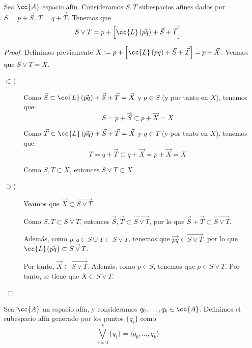 \begin{prop}
    Sea $\cc{A}$ espacio afín. Consideramos $S,T$ subespacios afines dados por $S=p+\vec{S}$, $T=q+\vec{T}$. Tenemos que
    $$S\vee T = p+\left[\cc{L}\left(\vec{pq}\right) + \vec{S} + \vec{T}\right]$$
\end{prop}
\begin{proof}Definimos previamente $X:=p+\left[\cc{L}\left(\vec{pq}\right) + \vec{S} + \vec{T}\right]=p+\vec{X}$. Veamos que $S\vee T=X$.
    \begin{description}
        \item[$\subset$)] 
            Como $\vec{S}\subset \cc{L}\left(\vec{pq}\right) + \vec{S} + \vec{T}=\vec{X}$ y $p\in S$ (y por tanto en $X$), tenemos que:
            \begin{equation*}
                S=p+\vec{S}\subset p+ \vec{X} = X
            \end{equation*}

            Como $\vec{T}\subset \cc{L}\left(\vec{pq}\right) + \vec{S} + \vec{T}=\vec{X}$ y $q\in T$ (y por tanto en $X$), tenemos que:
            \begin{equation*}
                T=q+\vec{T}\subset q+ \vec{X} = p+ \vec{X} = X
            \end{equation*}

            Como $S,T\subset X$, entonces $S\vee T\subset X$.
            
        \item[$\supset$)] Veamos que $\vec{X}\subset \vec{S\vee T}$.

        Como $S,T\subset S\vee T$, entonces $\vec{S},\vec{T}\subset \vec{S\vee T}$, por lo que $\vec{S}+\vec{T}\subset \vec{S\vee T}$.
        
        Además, como $p,q\in S\cup T\subset S\vee T$, tenemos que $\vec{pq}\in \vec{S\vee T}$, por lo que $\cc{L}\{\vec{pq}\}\subset \vec{S\vee T}$.

        Por tanto, $\vec{X}\subset \vec{S\vee T}$. Además, como $p\in S$, tenemos que $p\in S\vee T$. Por tanto, se tiene que $X\subset S\vee T$.
    \end{description}
\end{proof}

\begin{notacion}
    Sea $\cc{A}$ un espacio afín, y consideramos $q_0,\dots,q_k\in \cc{A}$. Definimos el subespacio afín generado por los puntos $\{q_i\}$ como:
    \begin{equation*}
        \bigvee_{i=0}^k \{q_i\} = \langle q_0,\dots,q_k \rangle
    \end{equation*}
\end{notacion}


